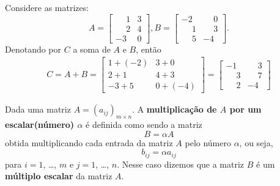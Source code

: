 \documentclass{beamer}
\begin{document}
  \begin{frame}
    \begin{exemplos}
      Considere as matrizes:
      \[
        A = \begin{bmatrix}
          \phantom{-}1 & 3\\
          \phantom{-}2 & 4\\
          -3 & 0
        \end{bmatrix},
       B = \begin{bmatrix}
          -2 & \phantom{-}0\\
          \phantom{-}1 & \phantom{-}3\\
          \phantom{-}5 & -4
        \end{bmatrix}.
    \]
    Denotando por $C$ a soma de $A$ e $B$, então
    \begin{align*}
     C = A + B = \begin{bmatrix}
       1 + (-2) & 3 + 0\\
       2 + 1 & 4 + 3\\
       -3 + 5 & 0 + (-4)
     \end{bmatrix} = \begin{bmatrix}
      -1 & \phantom{-}3\\
      \phantom{-}3 & \phantom{-}7\\
      \phantom{-}2 & -4
     \end{bmatrix}
    \end{align*}
    \end{exemplos}
  \end{frame}

  \begin{frame}
    \begin{definicao}
      Dada uma matriz $A = (a_{ij})_{m \times n}$. A \textbf{multiplicação de $A$ por um escalar(número) $\alpha$} é definida
      como sendo a matriz
      \[
        B = \alpha A
      \]
      obtida multiplicando cada entrada da matriz $A$ pelo número $\alpha$, ou seja,
      \[
        b_{ij} = \alpha a_{ij}
      \]
      para $i = 1$, \dots, $m$ e $j = 1$, \dots, $n$. Nesse caso dizemos que a matriz $B$ é um \textbf{múltiplo escalar} da matriz $A$.
    \end{definicao}
  \end{frame}
\end{document}
